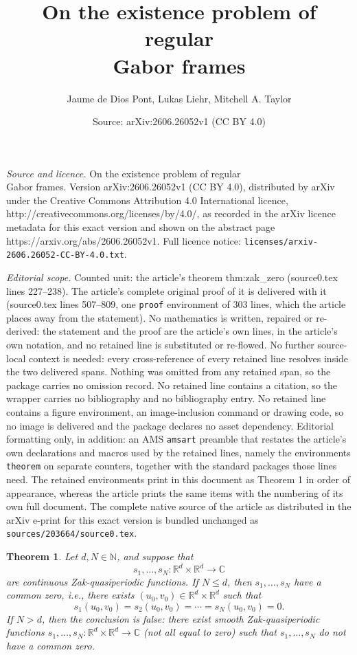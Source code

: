 \documentclass[10pt,a4paper]{amsart}
\title{On the existence problem of regular \\ Gabor frames}
\author{Jaume de Dios Pont, Lukas Liehr, Mitchell A. Taylor}
\date{Source: arXiv:2606.26052v1 (CC BY 4.0)}
\newtheorem{theorem}{Theorem}
\def\N{{\mathbb N}}
\begin{document}
\maketitle

\noindent\emph{Source and licence.} On the existence problem of regular \\ Gabor frames. Version arXiv:2606.26052v1 (CC BY 4.0), distributed by arXiv under the Creative Commons Attribution 4.0 International licence, http://creativecommons.org/licenses/by/4.0/, as recorded in the arXiv licence metadata for this exact version and shown on the abstract page https://arxiv.org/abs/2606.26052v1. Full licence notice: \texttt{licenses/arxiv-2606.26052-CC-BY-4.0.txt}.\par\smallskip

\noindent\textit{Editorial scope.} Counted unit: the article's theorem thm:zak\_zero (source0.tex lines 227--238). The article's complete original proof of it is delivered with it (source0.tex lines 507--809, one \texttt{proof} environment of 303 lines, which the article places away from the statement). No mathematics is written, repaired or re-derived: the statement and the proof are the article's own lines, in the article's own notation, and no retained line is substituted or re-flowed.  No further source-local context is needed: every cross-reference of every retained line resolves inside the two delivered spans.  Nothing was omitted from any retained span, so the package carries no omission record.  No retained line contains a citation, so the wrapper carries no bibliography and no bibliography entry.  No retained line contains a figure environment, an image-inclusion command or drawing code, so no image is delivered and the package declares no asset dependency.  Editorial formatting only, in addition: an AMS \texttt{amsart} preamble that restates the article's own declarations and macros used by the retained lines, namely the environments \texttt{theorem} on separate counters, together with the standard packages those lines need.  The retained environments print in this document as Theorem 1 in order of appearance, whereas the article prints the same items with the numbering of its own full document.  The complete native source of the article as distributed in the arXiv e-print for this exact version is bundled unchanged as \texttt{sources/203664/source0.tex}.
\begin{theorem}\label{thm:zak_zero}
Let $d,N\in \N$, and suppose that
$$
s_1,\dots,s_N:\mathbb R^d \times \mathbb R^d \to \mathbb C
$$
are continuous Zak-quasiperiodic functions. If $N \leq d$, then $s_1,\dots,s_N$ have a common zero, i.e., there exists $(u_0,v_0)\in\mathbb R^d\times\mathbb R^d$ such that
$$
s_1(u_0,v_0)=s_2(u_0,v_0)=\cdots=s_N(u_0,v_0)=0.
$$
If $N>d$, then the conclusion is false: there exist smooth Zak-quasiperiodic functions
$s_1,\dots,s_N :\mathbb R^d \times \mathbb R^d  \to \mathbb C$ (not all equal to zero) such that $s_1,\dots,s_N$ do not have a common zero.
\end{theorem}
\end{document}
